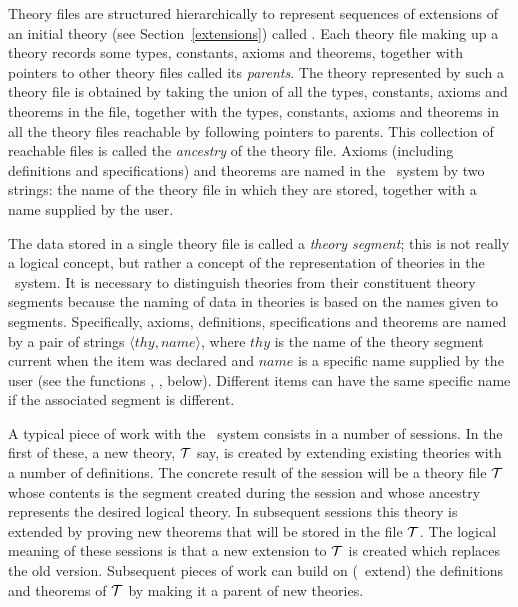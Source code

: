 Theory files are structured hierarchically to represent sequences of
extensions of an initial theory (see Section~\ref{extensions}) called
. Each theory file making up a theory records some types, constants,
axioms and theorems, together with pointers to other theory files called its
{\it parents\/}.  The theory represented by such a theory file is obtained by
taking the union of all the types, constants, axioms and theorems in the file,
together with the types, constants, axioms and theorems in all the theory
files reachable by following pointers to parents. This collection of reachable
files is called the {\it ancestry\/}
of the theory file. Axioms (including
definitions and specifications) and theorems are named in the \HOL\ system by
two strings: the name of the theory file in which they are stored, together with
a name supplied by the user.

The data stored in a single theory file is called a {\it theory segment\/};
this is not really a logical concept, but rather a concept of the
representation of theories in the \HOL\ system. It is necessary to distinguish
theories from their constituent theory segments  because the naming of data
in theories is based on the names given to segments.  Specifically, axioms,
definitions, specifications and theorems are named
 by a pair of strings
$\langle thy,name \rangle$,
where $thy$ is the name of the theory segment current when the
item was declared and $name$ is a specific name supplied by the user (see the
functions , , below). Different items
can have the same specific name if the associated segment is different.

A typical piece of work with the \HOL\ system consists in a number of
sessions.
In the first of these, a new theory, ${\cal T}$ say, is created by
extending existing theories with a number of definitions. The concrete result
of the session will be a theory file ${\cal T}$ whose contents is the
segment created during the session and whose ancestry represents the desired
logical theory.  In subsequent sessions this theory is extended by proving new
theorems that will be stored in the file ${\cal T}$. The logical
meaning of these sessions is that a new extension to ${\cal T}$ is created
which replaces the old version.  Subsequent pieces of work can build on (\ie\
extend) the definitions and theorems of ${\cal T}$ by making it a parent of
new theories.

